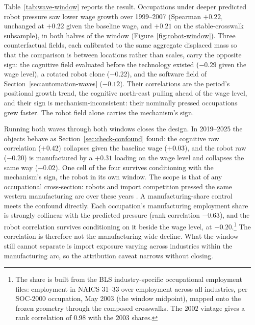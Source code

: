 \documentclass[12pt, a4paper]{article}
\begin{document}
Table~\ref{tab:wave-window} reports the result. Occupations under
deeper predicted robot pressure saw lower wage growth over 1999--2007
(Spearman $+0.22$, unchanged at $+0.22$ given the baseline wage, and
$+0.21$ on the stable-crosswalk subsample), in both halves of the
window (Figure~\ref{fig:robot-window}). Three counterfactual fields,
each calibrated to the same aggregate displaced mass so that the
comparison is between locations rather than scales, carry the opposite
sign: the cognitive field evaluated before the technology existed
($-0.29$ given the wage level), a rotated robot clone ($-0.22$), and
the software field of Section~\ref{sec:automation-waves} ($-0.12$). Their correlations are the period's
positional growth trend, the cognitive north-east pulling ahead of the
wage level, and their sign is mechanism-inconsistent: their nominally
pressed occupations grew faster. The robot field alone carries the
mechanism's sign.

Running both waves through both windows closes the design. In
2019--2025 the objects behave as Section~\ref{sec:check-confound}
found: the cognitive raw correlation ($+0.42$) collapses given the
baseline wage ($+0.03$), and the robot raw ($-0.20$) is manufactured by
a $+0.31$ loading on the wage level and collapses the same way
($-0.02$). One cell of the four survives conditioning with the
mechanism's sign, the robot in its own window. The scope is that of any
occupational cross-section: robots and import competition pressed the
same western manufacturing arc over these years
\parencite{autor2013china}. A manufacturing-share control meets the
confound directly. Each occupation's manufacturing employment share is
strongly collinear with the predicted pressure (rank correlation
$-0.63$), and the robot correlation survives conditioning on it beside
the wage level, at $+0.20$.\footnote{The share is built from the BLS
industry-specific occupational employment files: employment in NAICS
31--33 over employment across all industries, per SOC-2000 occupation,
May 2003 (the window midpoint), mapped onto the frozen geometry through
the composed crosswalks. The 2002 vintage gives a rank correlation of
$0.98$ with the 2003 shares.} The correlation is therefore not the
manufacturing-wide decline. What the window still cannot separate is
import exposure varying across industries within the manufacturing arc,
so the attribution caveat narrows without closing.
\end{document}
